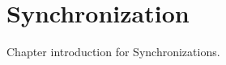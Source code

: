 \pagebreak
\chapter{Synchronization}
\label{chap:synchronization}

Chapter introduction for Synchronizations.
